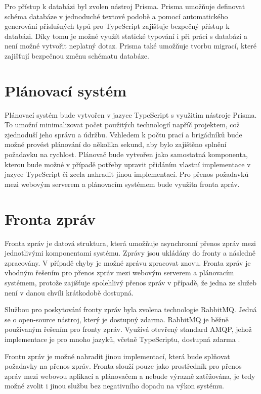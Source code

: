 Pro přístup k databázi byl zvolen nástroj Prisma. Prisma umožňuje definovat schéma databáze v jednoduché textové podobě a pomocí automatického generování
příslušných typů pro TypeScript zajišťuje bezpečný přístup k databázi. Díky tomu je možné využít statické typování i při práci s databází a není možné vytvořit
neplatný dotaz. Prisma také umožňuje tvorbu migrací, které zajišťují bezpečnou změnu schématu databáze. 

\section{Plánovací systém}

Plánovací systém bude vytvořen v jazyce TypeScript s využitím nástroje Prisma. To umožní minimalizovat počet použitých technologií napříč projektem,
což zjednoduší jeho správu a údržbu. Vzhledem k počtu prací a brigádníků bude možné provést plánování do několika sekund, aby bylo zajištěno splnění požadavku na rychlost.
Plánovač bude vytvořen jako samostatná komponenta, kterou bude možné v případě potřeby upravit přidáním vlastní implementace v jazyce TypeScript
či zcela nahradit jinou implementací. 
Pro přenos požadavků mezi webovým serverem a plánovacím systémem bude využita fronta zpráv.

\section{Fronta zpráv}

Fronta zpráv je datová struktura, která umožňuje asynchronní přenos zpráv mezi jednotlivými komponentami systému. Zprávy jsou ukládány do fronty
a následně zpracovány. V případě chyby je možné zprávu zpracovat znovu. Fronta zpráv je vhodným řešením pro přenos zpráv mezi webovým serverem a plánovacím systémem,
protože zajišťuje spolehlivý přenos zpráv v případě, že jedna ze služeb není v danou chvíli krátkodobě dostupná.

Službou pro poskytování fronty zpráv byla zvolena technologie RabbitMQ. Jedná se o open-source nástroj, který je dostupný zdarma. RabbitMQ je běžně používaným řešením
pro fronty zpráv. Využívá otevřený standard AMQP, jehož implementace je pro mnoho jazyků, včetně TypeScriptu, dostupná zdarma \cite{rabbitmq}.

Frontu zpráv je možné nahradit jinou implementací, která bude splňovat požadavky na přenos zpráv. Fronta slouží pouze jako prostředník pro přenos zpráv mezi webovou aplikací
a plánovačem a nebude výrazně zatěžována, je tedy možné zvolit i jinou službu bez negativního dopadu na výkon systému.


